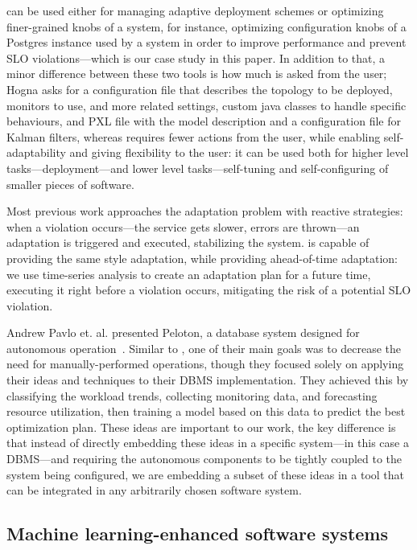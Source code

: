 \projectname{} can be used either for managing adaptive deployment schemes or optimizing finer-grained knobs of a system, for instance, optimizing configuration knobs of a Postgres instance used by a system in order to improve performance and prevent SLO violations---which is our case study in this paper. In addition to that, a minor difference between these two tools is how much is asked from the user; Hogna asks for a configuration file that describes the topology to be deployed, monitors to use, and more related settings, custom java classes to handle specific behaviours, and PXL file with the model description and a configuration file for Kalman filters, whereas \projectname{} requires fewer actions from the user, while enabling self-adaptability and giving flexibility to the user: it can be used both for higher level tasks---deployment---and lower level tasks---self-tuning and self-configuring of smaller pieces of software.

Most previous work approaches the adaptation problem with reactive strategies: when a violation occurs---the service gets slower, errors are thrown---an adaptation is triggered and executed, stabilizing the system. \projectname{} is capable of providing the same style adaptation, while providing ahead-of-time adaptation: we use time-series analysis to create an adaptation plan for a future time, executing it right before a violation occurs, mitigating the risk of a potential SLO violation. 

Andrew Pavlo et. al. presented Peloton, a database system designed for autonomous operation~\cite{andrew_pavlo_self-driving_2017}. Similar to \projectname{}, one of their main goals was to decrease the need for manually-performed operations, though they focused solely on applying their ideas and techniques to their DBMS implementation. They achieved this by classifying the workload trends, collecting monitoring data, and forecasting resource utilization, then training a model based on this data to predict the best optimization plan. These ideas are important to our work, the key difference is that instead of directly embedding these ideas in a specific system---in this case a DBMS---and requiring the autonomous components to be tightly coupled to the system being configured, we are embedding a subset of these ideas in a tool that can be integrated in any arbitrarily chosen software system.

\subsection{Machine learning-enhanced software systems}

